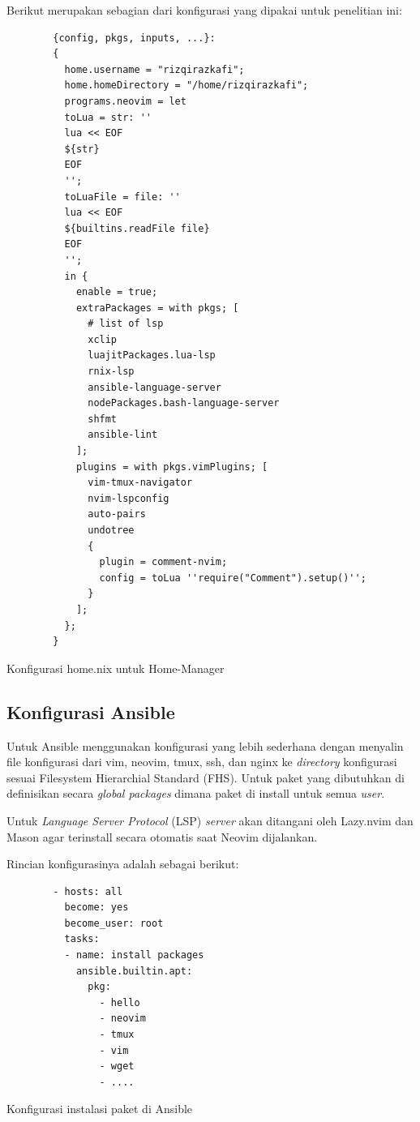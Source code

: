 \documentclass[10pt,]{report}
\newenvironment{code}{\captionsetup{type=listing}}{\vspace{3mm}}
\begin{document}
\begin{adjustwidth}{20pt}{}
\begin{adjustwidth}{20pt}{}
		Berikut merupakan sebagian dari konfigurasi yang dipakai untuk penelitian ini:

		\begin{code}
			\begin{verbatim}
        {config, pkgs, inputs, ...}:
        {
          home.username = "rizqirazkafi";
          home.homeDirectory = "/home/rizqirazkafi";
          programs.neovim = let
          toLua = str: ''
          lua << EOF
          ${str}
          EOF
          '';
          toLuaFile = file: ''
          lua << EOF
          ${builtins.readFile file}
          EOF
          '';
          in {
            enable = true;
            extraPackages = with pkgs; [
              # list of lsp
              xclip
              luajitPackages.lua-lsp
              rnix-lsp
              ansible-language-server
              nodePackages.bash-language-server
              shfmt
              ansible-lint
            ];
            plugins = with pkgs.vimPlugins; [
              vim-tmux-navigator
              nvim-lspconfig
              auto-pairs
              undotree
              {
                plugin = comment-nvim;
                config = toLua ''require("Comment").setup()'';
              }
            ];
          };
        }
      \end{verbatim}
			\caption{Konfigurasi home.nix untuk Home-Manager}
		\end{code}
	\end{adjustwidth}
	\subsection{Konfigurasi Ansible}
	\vspace{-3mm}
	\begin{adjustwidth}{20pt}{}
		\hspace\parindent
		Untuk Ansible menggunakan konfigurasi yang lebih sederhana dengan menyalin
		file konfigurasi dari vim, neovim, tmux, ssh, dan nginx ke
		\textit{directory} konfigurasi sesuai Filesystem Hierarchial Standard
		(FHS). Untuk paket yang dibutuhkan di definisikan secara \textit{global
			packages} dimana paket di install untuk semua \textit{user}.

		Untuk \textit{Language Server Protocol} (LSP) \textit{server} akan
		ditangani oleh Lazy.nvim dan Mason agar terinstall secara otomatis
		saat Neovim dijalankan.

		Rincian konfigurasinya adalah sebagai berikut:

		\begin{code}
			\begin{verbatim}
        - hosts: all
          become: yes
          become_user: root
          tasks:
          - name: install packages
            ansible.builtin.apt:
              pkg:
                - hello
                - neovim
                - tmux
                - vim
                - wget
                - ....
      \end{verbatim}
			\caption{Konfigurasi instalasi paket di Ansible}
		\end{code}


\end{adjustwidth}
\end{adjustwidth}
\end{document}

